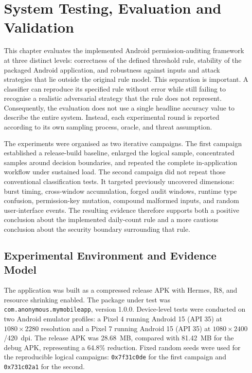 \newpage
\section{System Testing, Evaluation and Validation}

This chapter evaluates the implemented Android permission-auditing framework at three distinct levels: correctness of the defined threshold rule, stability of the packaged Android application, and robustness against inputs and attack strategies that lie outside the original rule model. This separation is important. A classifier can reproduce its specified rule without error while still failing to recognise a realistic adversarial strategy that the rule does not represent. Consequently, the evaluation does not use a single headline accuracy value to describe the entire system. Instead, each experimental round is reported according to its own sampling process, oracle, and threat assumption.

The experiments were organised as two iterative campaigns. The first campaign established a release-build baseline, enlarged the logical sample, concentrated samples around decision boundaries, and repeated the complete in-application workflow under sustained load. The second campaign did not repeat those conventional classification tests. It targeted previously uncovered dimensions: burst timing, cross-window accumulation, forged audit windows, runtime type confusion, permission-key mutation, compound malformed inputs, and random user-interface events. The resulting evidence therefore supports both a positive conclusion about the implemented daily-count rule and a more cautious conclusion about the security boundary surrounding that rule.

\subsection{Experimental Environment and Evidence Model}

The application was built as a compressed release APK with Hermes, R8, and resource shrinking enabled. The package under test was \texttt{com.anonymous.mymobileapp}, version 1.0.0. Device-level tests were conducted on two Android emulator profiles: a Pixel 4 running Android 15 (API 35) at $1080 \times 2280$ resolution and a Pixel 7 running Android 15 (API 35) at $1080 \times 2400$/420~dpi. The release APK was 28.68~MB, compared with 81.42~MB for the debug APK, representing a 64.8\% reduction. Fixed random seeds were used for the reproducible logical campaigns: \texttt{0x7f31c0de} for the first campaign and \texttt{0x731c02a1} for the second.

